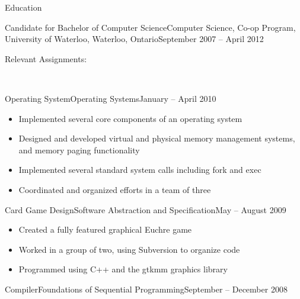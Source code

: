 \documentclass[11pt]{article}
\begin{document}
	\begin{section}{Education} \\

		\begin{subsection}{Candidate for Bachelor of Computer Science}{Computer Science, Co-op Program, University of Waterloo, Waterloo, Ontario}{September 2007 -- April 2012}

			\begin{indent}
				\begin{bf}Relevant Assignments:\end{bf} \\

                \begin{subsection}{Operating System}{Operating Systems}{January -- April 2010}

					\begin{itemize}
						\item Implemented several core components of an operating system
                        \item Designed and developed virtual and physical memory management systems, and memory paging functionality
                        \item Implemented several standard system calls including fork and exec
                        \item Coordinated and organized efforts in a team of three
					\end{itemize}

                \end{subsection}

				\begin{subsection}{Card Game Design}{Software Abstraction and Specification}{May -- August 2009}

					\begin{itemize}
						\item Created a fully featured graphical Euchre game
						\item Worked in a group of two, using Subversion to organize code
						\item Programmed using C++ and the gtkmm graphics library
					\end{itemize}

				\end{subsection}

				\begin{subsection}{Compiler}{Foundations of Sequential Programming}{September -- December 2008}


\end{subsection}
\end{indent}
\end{subsection}
\end{section}
\end{document}
